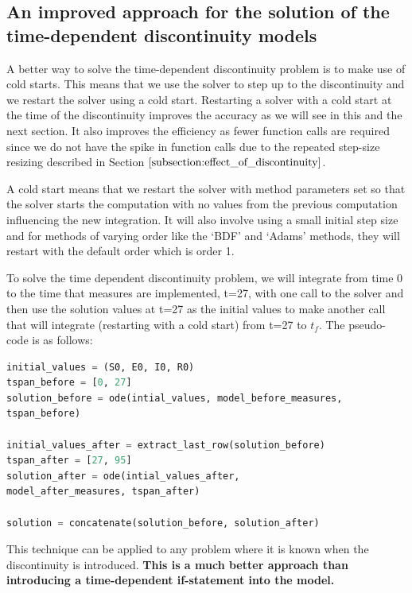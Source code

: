 \subsection{An improved approach for the solution of the time-dependent discontinuity models}
\label{subsection:time_disc_handling}
A better way to solve the time-dependent discontinuity problem is to make use of cold starts. This means that we use the solver to step up to the discontinuity and we restart the solver using a cold start. Restarting a solver with a cold start at the time of the discontinuity improves the accuracy as we will see in this and the next section. It also improves the efficiency as fewer function calls are required since we do not have the spike in function calls due to the repeated step-size resizing described in Section $\ref{subsection:effect_of_discontinuity}$.

A cold start means that we restart the solver with method parameters set so that the solver starts the computation with no values from the previous computation influencing the new integration. It will also involve using a small initial step size and for methods of varying order like the `BDF' and `Adams' methods, they will restart with the default order which is order 1.

To solve the time dependent discontinuity problem, we will integrate from time 0 to the time that measures are implemented, t=27, with one call to the solver and then use the solution values at t=27 as the initial values to make another call that will integrate (restarting with a cold start) from t=27 to $t_f$. The pseudo-code is as follows:

\begin{minipage}{\linewidth}
\begin{lstlisting}[language=Python]
initial_values = (S0, E0, I0, R0)
tspan_before = [0, 27]
solution_before = ode(intial_values, model_before_measures,
tspan_before)

initial_values_after = extract_last_row(solution_before)
tspan_after = [27, 95]
solution_after = ode(intial_values_after, 
model_after_measures, tspan_after)

solution = concatenate(solution_before, solution_after)
\end{lstlisting}
\end{minipage}

This technique can be applied to any problem where it is known when the discontinuity is introduced. {\bfseries This is a much better approach than introducing a time-dependent if-statement into the model.}


